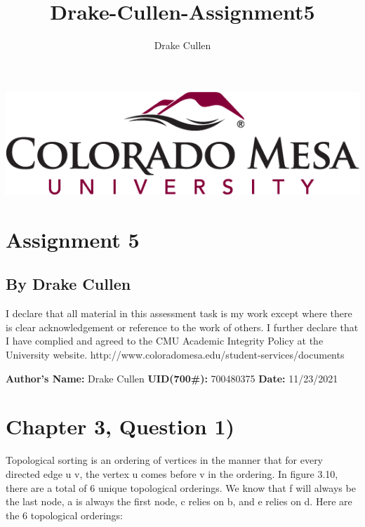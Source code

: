 \documentclass[11pt]{article}
\title{Drake-Cullen-Assignment5}
\author{Drake Cullen}
\begin{document}
\begin{minipage}{\linewidth}%
\centering
\includegraphics[keepaspectratio=true,scale=0.35]{CMU.png}
\end{minipage}
\section*{ \centering Assignment 5}
\subsection*{ \centering By Drake Cullen} 

\vspace{5mm}
 
I declare that all material in this assessment task is my work except where there is clear acknowledgement or reference to the work of others. I further declare that I have complied and agreed to the CMU Academic Integrity Policy at the University website. http://www.coloradomesa.edu/student-services/documents
\begin{center}
\textbf{Author’s Name:} Drake Cullen 
\textbf{UID(700\#):} 700480375
\textbf{ Date:} 11/23/2021
\end{center} 

\section{Chapter 3, Question 1)}
Topological sorting is an ordering of vertices in the manner that  for every directed edge u v, the vertex u comes before v in the ordering. In figure 3.10, there are a total of 6 unique topological orderings. We know that f will always be the last node, a is always the first node, c relies on b, and e relies on d. Here are the 6 topological orderings:
\end{document}
